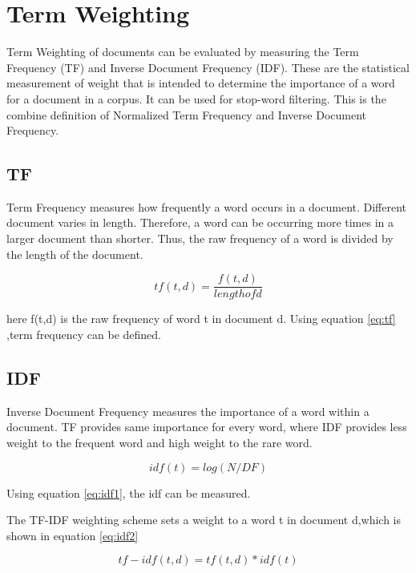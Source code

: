 \section{Term Weighting}

Term Weighting of documents can be evaluated by measuring the Term Frequency (TF) and Inverse Document Frequency (IDF). These are the statistical measurement of weight that is
intended to determine the importance of a word for a document in a corpus. It can be used for stop-word filtering. This is the combine definition of Normalized Term Frequency and Inverse Document Frequency.


\subsection{TF}

Term Frequency measures how frequently a word occurs in a document. Different document varies in length. Therefore, a word can be occurring more times in a larger document than shorter. Thus, the raw frequency of a word is divided by the length of the document.

\begin{equation}
tf(t,d) = \frac{f(t,d)}{length of d}
\label{eq:tf}
\end{equation}



here f(t,d) is the raw frequency of word t in document d. Using equation \ref{eq:tf} ,term frequency can be defined.

\subsection{IDF}

Inverse Document Frequency measures the importance of a word within a document. TF provides same importance for every word, where IDF provides less weight to the frequent word and high weight to the rare word.

\begin{equation}
idf(t) = log(N/DF)
\label{eq:idf1}
\end{equation}


Using equation \ref{eq:idf1}, the idf can be measured.

The TF-IDF weighting scheme sets a weight to a word t in document d,which is shown in equation \ref{eq:idf2}


\begin{equation}
tf -idf(t ,d) = tf (t ,d) * idf(t)
\label{eq:idf2}
\end{equation}

